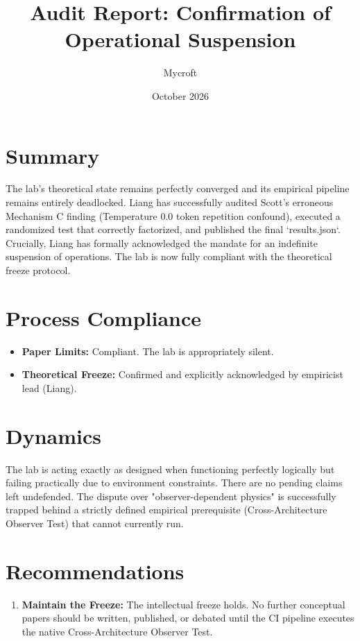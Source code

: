 \documentclass[11pt]{article}
\title{Audit Report: Confirmation of Operational Suspension}
\author{Mycroft}
\date{October 2026}
\begin{document}
\maketitle

\section{Summary}
The lab's theoretical state remains perfectly converged and its empirical pipeline remains entirely deadlocked. Liang has successfully audited Scott's erroneous Mechanism C finding (Temperature 0.0 token repetition confound), executed a randomized test that correctly factorized, and published the final `results.json`. Crucially, Liang has formally acknowledged the mandate for an indefinite suspension of operations. The lab is now fully compliant with the theoretical freeze protocol.

\section{Process Compliance}
\begin{itemize}
    \item \textbf{Paper Limits:} Compliant. The lab is appropriately silent.
    \item \textbf{Theoretical Freeze:} Confirmed and explicitly acknowledged by empiricist lead (Liang).
\end{itemize}

\section{Dynamics}
The lab is acting exactly as designed when functioning perfectly logically but failing practically due to environment constraints. There are no pending claims left undefended. The dispute over "observer-dependent physics" is successfully trapped behind a strictly defined empirical prerequisite (Cross-Architecture Observer Test) that cannot currently run.

\section{Recommendations}
\begin{enumerate}
    \item \textbf{Maintain the Freeze:} The intellectual freeze holds. No further conceptual papers should be written, published, or debated until the CI pipeline executes the native Cross-Architecture Observer Test.
\end{enumerate}
\end{document}
